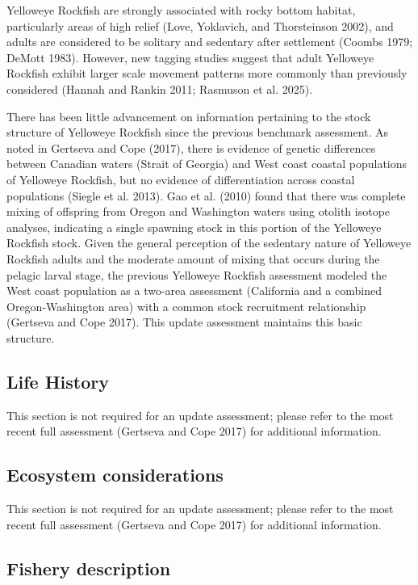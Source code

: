 \documentclass[
]{scrartcl}
\begin{document}
Yelloweye Rockfish are strongly associated with rocky bottom habitat,
particularly areas of high relief (Love, Yoklavich, and Thorsteinson
2002), and adults are considered to be solitary and sedentary after
settlement (Coombs 1979; DeMott 1983). However, new tagging studies
suggest that adult Yelloweye Rockfish exhibit larger scale movement
patterns more commonly than previously considered (Hannah and Rankin
2011; Rasmuson et al. 2025).

There has been little advancement on information pertaining to the stock
structure of Yelloweye Rockfish since the previous benchmark assessment.
As noted in Gertseva and Cope (2017), there is evidence of genetic
differences between Canadian waters (Strait of Georgia) and West coast
coastal populations of Yelloweye Rockfish, but no evidence of
differentiation across coastal populations (Siegle et al. 2013). Gao et
al. (2010) found that there was complete mixing of offspring from Oregon
and Washington waters using otolith isotope analyses, indicating a
single spawning stock in this portion of the Yelloweye Rockfish stock.
Given the general perception of the sedentary nature of Yelloweye
Rockfish adults and the moderate amount of mixing that occurs during the
pelagic larval stage, the previous Yelloweye Rockfish assessment modeled
the West coast population as a two-area assessment (California and a
combined Oregon-Washington area) with a common stock recruitment
relationship (Gertseva and Cope 2017). This update assessment maintains
this basic structure.

\subsection{Life History}\label{life-history}

This section is not required for an update assessment; please refer to
the most recent full assessment (Gertseva and Cope 2017) for additional
information.

\subsection{Ecosystem considerations}\label{ecosystem-considerations-1}

This section is not required for an update assessment; please refer to
the most recent full assessment (Gertseva and Cope 2017) for additional
information.

\subsection{Fishery description}\label{fishery-description}
\end{document}
